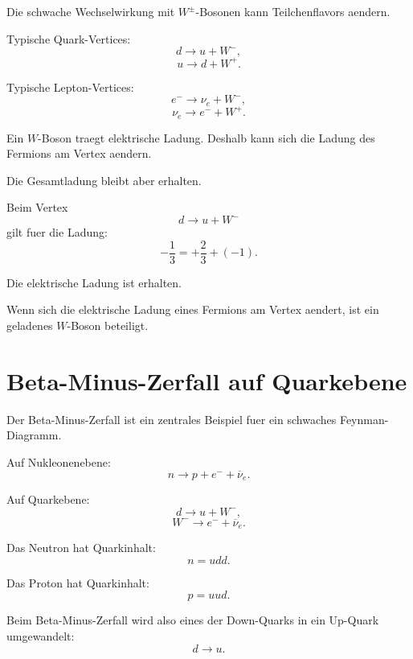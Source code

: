 Die schwache Wechselwirkung mit $W^\pm$-Bosonen kann Teilchenflavors aendern.

\begin{formulabox}
Typische Quark-Vertices:
\[
    d \rightarrow u + W^-,
\]
\[
    u \rightarrow d + W^+.
\]
\end{formulabox}

\begin{formulabox}
Typische Lepton-Vertices:
\[
    e^- \rightarrow \nu_e + W^-,
\]
\[
    \nu_e \rightarrow e^- + W^+.
\]
\end{formulabox}

\begin{conceptbox}
Ein $W$-Boson traegt elektrische Ladung.
Deshalb kann sich die Ladung des Fermions am Vertex aendern.

Die Gesamtladung bleibt aber erhalten.
\end{conceptbox}

\begin{examplebox}
Beim Vertex
\[
    d \rightarrow u + W^-
\]
gilt fuer die Ladung:
\[
    -\frac{1}{3}
    =
    +\frac{2}{3}
    +
    (-1).
\]

Die elektrische Ladung ist erhalten.
\end{examplebox}

\begin{examtipbox}
Wenn sich die elektrische Ladung eines Fermions am Vertex aendert, ist ein geladenes
$W$-Boson beteiligt.
\end{examtipbox}

\section{Beta-Minus-Zerfall auf Quarkebene}

Der Beta-Minus-Zerfall ist ein zentrales Beispiel fuer ein schwaches
Feynman-Diagramm.

\begin{formulabox}
Auf Nukleonenebene:
\[
    n \rightarrow p + e^- + \overline{\nu}_e.
\]
\end{formulabox}

\begin{formulabox}
Auf Quarkebene:
\[
    d \rightarrow u + W^-,
\]
\[
    W^- \rightarrow e^- + \overline{\nu}_e.
\]
\end{formulabox}

\begin{conceptbox}
Das Neutron hat Quarkinhalt:
\[
    n=udd.
\]

Das Proton hat Quarkinhalt:
\[
    p=uud.
\]

Beim Beta-Minus-Zerfall wird also eines der Down-Quarks in ein Up-Quark umgewandelt:
\[
    d \rightarrow u.
\]
\end{conceptbox}

